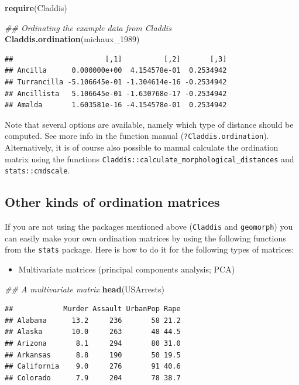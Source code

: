 \documentclass[]{book}
\newenvironment{Shaded}{\begin{snugshade}}{\end{snugshade}}
\newcommand{\CommentTok}[1]{\textcolor[rgb]{0.56,0.35,0.01}{\textit{#1}}}
\newcommand{\DecValTok}[1]{\textcolor[rgb]{0.00,0.00,0.81}{#1}}
\newcommand{\KeywordTok}[1]{\textcolor[rgb]{0.13,0.29,0.53}{\textbf{#1}}}
\newcommand{\NormalTok}[1]{#1}
\providecommand{\tightlist}{%
  \setlength{\itemsep}{0pt}\setlength{\parskip}{0pt}}
\begin{document}
\begin{Shaded}
\begin{Highlighting}[]
\KeywordTok{require}\NormalTok{(Claddis)}

\CommentTok{## Ordinating the example data from Claddis}
\KeywordTok{Claddis.ordination}\NormalTok{(michaux_}\DecValTok{1989}\NormalTok{)}
\end{Highlighting}
\end{Shaded}

\begin{verbatim}
##                      [,1]          [,2]       [,3]
## Ancilla      0.000000e+00  4.154578e-01  0.2534942
## Turrancilla -5.106645e-01 -1.304614e-16 -0.2534942
## Ancillista   5.106645e-01 -1.630768e-17 -0.2534942
## Amalda       1.603581e-16 -4.154578e-01  0.2534942
\end{verbatim}

Note that several options are available, namely which type of distance should be computed.
See more info in the function manual (\texttt{?Claddis.ordination}).
Alternatively, it is of course also possible to manual calculate the ordination matrix using the functions \texttt{Claddis::calculate\_morphological\_distances} and \texttt{stats::cmdscale}.

\hypertarget{other-kinds-of-ordination-matrices}{%
\subsection{Other kinds of ordination matrices}\label{other-kinds-of-ordination-matrices}}

If you are not using the packages mentioned above (\texttt{Claddis} and \texttt{geomorph}) you can easily make your own ordination matrices by using the following functions from the \texttt{stats} package.
Here is how to do it for the following types of matrices:

\begin{itemize}
\tightlist
\item
  Multivariate matrices (principal components analysis; PCA)
\end{itemize}

\begin{Shaded}
\begin{Highlighting}[]
\CommentTok{## A multivariate matrix}
\KeywordTok{head}\NormalTok{(USArrests)}
\end{Highlighting}
\end{Shaded}

\begin{verbatim}
##            Murder Assault UrbanPop Rape
## Alabama      13.2     236       58 21.2
## Alaska       10.0     263       48 44.5
## Arizona       8.1     294       80 31.0
## Arkansas      8.8     190       50 19.5
## California    9.0     276       91 40.6
## Colorado      7.9     204       78 38.7
\end{verbatim}
\end{document}
